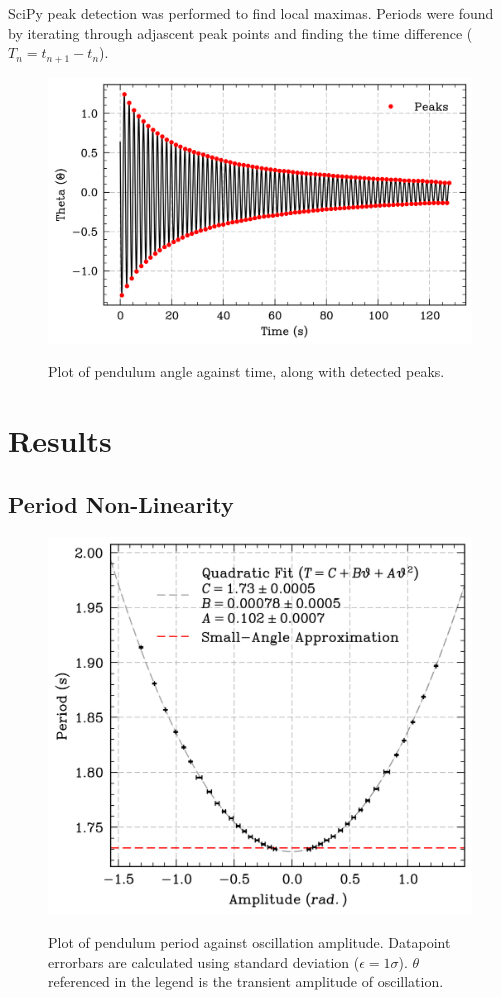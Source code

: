 \documentclass[prl,twocolumn,amsmath,amssymb,superscriptaddress]{revtex4-2}
\begin{document}
SciPy peak detection was performed to find local maximas. Periods were found by iterating through adjascent peak points and finding the time difference ($T_n=t_{n+1}-t_{n}$).

\begin{figure}[htb]
    \includegraphics[width=0.8\linewidth]{angle_time.png}
    \label{fig:angle_time}
    \caption{Plot of pendulum angle against time, along with detected peaks.}
\end{figure}

\section{Results}


\subsection{Period Non-Linearity}
\vspace{-20pt}
\begin{figure}[htb]
    \hspace{-20pt}
    \includegraphics[width=0.9\linewidth]{amp_per_error_of_mean.png}
    \label{fig:amplitude-period}
    \caption{Plot of pendulum period against oscillation amplitude. Datapoint errorbars are calculated using standard deviation ($\epsilon = 1\sigma$). $\theta$ referenced in the legend is the transient amplitude of oscillation.}
\end{figure}
\end{document}
